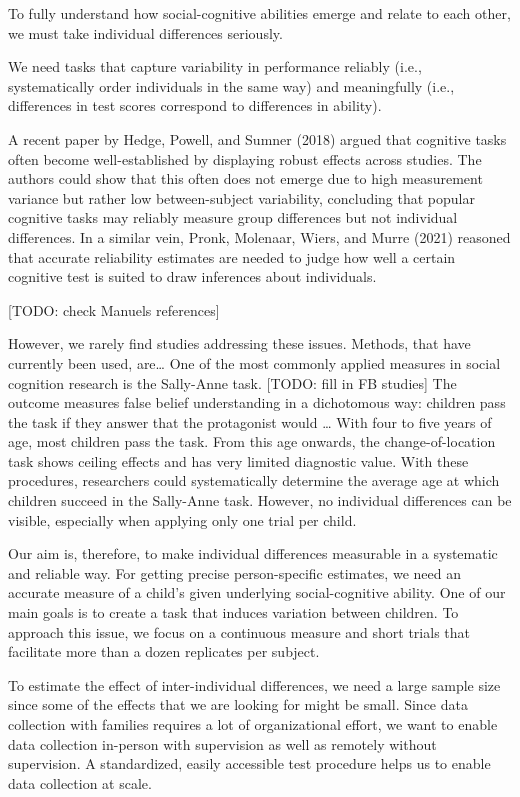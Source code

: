 \documentclass[
  man,floatsintext]{apa6}
\begin{document}
To fully understand how social-cognitive abilities emerge and relate to each other, we must take individual differences seriously.

We need tasks that capture variability in performance reliably (i.e., systematically order individuals in the same way) and meaningfully (i.e., differences in test scores correspond to differences in ability).

A recent paper by Hedge, Powell, and Sumner (2018) argued that cognitive tasks often become well-established by displaying robust effects across studies. The authors could show that this often does not emerge due to high measurement variance but rather low between-subject variability, concluding that popular cognitive tasks may reliably measure group differences but not individual differences. In a similar vein, Pronk, Molenaar, Wiers, and Murre (2021) reasoned that accurate reliability estimates are needed to judge how well a certain cognitive test is suited to draw inferences about individuals.

{[}TODO: check Manuels references{]}

However, we rarely find studies addressing these issues.
Methods, that have currently been used, are\ldots{}
One of the most commonly applied measures in social cognition research is the Sally-Anne task. {[}TODO: fill in FB studies{]}
The outcome measures false belief understanding in a dichotomous way: children pass the task if they answer that the protagonist would \ldots{}
With four to five years of age, most children pass the task. From this age onwards, the change-of-location task shows ceiling effects and has very limited diagnostic value. With these procedures, researchers could systematically determine the average age at which children succeed in the Sally-Anne task. However, no individual differences can be visible, especially when applying only one trial per child.

Our aim is, therefore, to make individual differences measurable in a systematic and reliable way. For getting precise person-specific estimates, we need an accurate measure of a child's given underlying social-cognitive ability. One of our main goals is to create a task that induces variation between children. To approach this issue, we focus on a continuous measure and short trials that facilitate more than a dozen replicates per subject.

To estimate the effect of inter-individual differences, we need a large sample size since some of the effects that we are looking for might be small. Since data collection with families requires a lot of organizational effort, we want to enable data collection in-person with supervision as well as remotely without supervision. A standardized, easily accessible test procedure helps us to enable data collection at scale.
\end{document}
